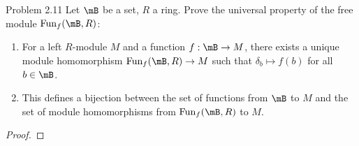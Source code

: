 \documentclass[a4paper]{article}
\begin{document}
\begin{ex}{Problem 2.11}{} Let $\mB$ be a set, $R$ a ring. Prove the universal property of the free module $\text{Fun}_f(\mB,R)$:
\begin{enumerate}
\item For a left $R$-module $M$ and a function $f:\mB\to M$, there exists a unique module homomorphism $\text{Fun}_f(\mB,R)\to M$ such that $\delta_b\mapsto f(b)$ for all $b\in\mB$. 
\item This defines a bijection between the set of functions from $\mB$ to $M$ and the set of module homomorphisms from $\text{Fun}_f(\mB,R)$ to $M$. 
\end{enumerate} 
\begin{proof}
\end{proof}
\end{ex}
\end{document}
